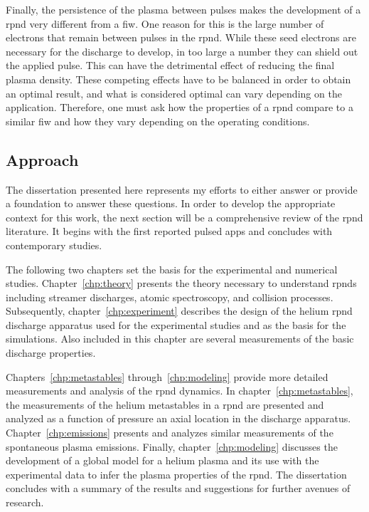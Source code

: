 Finally, the persistence of the plasma between pulses makes the development of a
\acs{rpnd} very different from a \acs{fiw}. One reason for this is the large
number of electrons that remain between pulses in the \acs{rpnd}. While these
seed electrons are necessary for the discharge to develop, in too large a number
they can shield out the applied pulse. This can have the detrimental effect of
reducing the final plasma density. These competing effects have to be balanced
in order to obtain an optimal result, and what is considered optimal can vary
depending on the application. Therefore, one must ask how the properties of a
\acs{rpnd} compare to a similar \acs{fiw} and how they vary depending on the
operating conditions.

\subsection{Approach}

The dissertation presented here represents my efforts to either answer or
provide a foundation to answer these questions. In order to develop the
appropriate context for this work, the next section will be a comprehensive
review of the \acs{rpnd} literature. It begins with the first reported pulsed
\acs{app}s and concludes with contemporary studies.

The following two chapters set the basis for the experimental and numerical
studies. Chapter~\ref{chp:theory} presents the theory necessary to understand
\acs{rpnd}s including streamer discharges, atomic spectroscopy, and collision
processes. Subsequently, chapter~\ref{chp:experiment} describes the design of
the helium \acs{rpnd} discharge apparatus used for the experimental studies and
as the basis for the simulations. Also included in this chapter are several
measurements of the basic discharge properties.

Chapters~\ref{chp:metastables} through~\ref{chp:modeling} provide more detailed
measurements and analysis of the \acs{rpnd} dynamics. In
chapter~\ref{chp:metastables}, the measurements of the helium metastables in a
\acs{rpnd} are presented and analyzed as a function of pressure an axial
location in the discharge apparatus. Chapter~\ref{chp:emissions} presents and
analyzes similar measurements of the spontaneous plasma emissions. Finally,
chapter~\ref{chp:modeling} discusses the development of a global model for a
helium plasma and its use with the experimental data to infer the plasma
properties of the \acs{rpnd}. The dissertation concludes with a summary of the
results and suggestions for further avenues of research.

